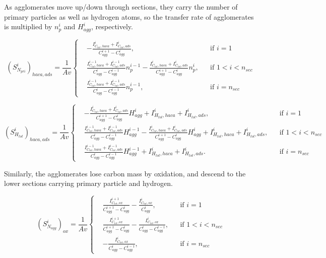 As agglomerates move up/down through sections, they carry the number of primary particles as well as hydrogen atoms, so the transfer rate of agglomerates is multiplied by ${n^i_p}$ and ${H^i_{agg}}$, respectively. 

\begin{equation}
	\left(S^i_{N_{pri}}\right)_{haca, ads}=
	\frac{1}{Av}
	\left\{
	\begin{aligned}
		&-\frac{I^i_{C_{tot},haca}+I^i_{C_{tot},ads}}{C^{i+1}_{agg}-C^{i}_{agg}},
		&&
		\text{if } i = 1
		\\
		&\frac{I^{i-1}_{C_{tot},haca}+I^{i-1}_{C_{tot},ads}}{C^{i}_{agg}-C^{i-1}_{agg}}n^{i-1}_p
		-\frac{I^{i}_{C_{tot},haca}+I^{i}_{C_{tot},ads}}{C^{i+1}_{agg}-C^{i}_{agg}}n^{i}_p,
		&&
		\text{if } 1 < i < n_{sec}
		\\
		&\frac{I^{i-1}_{C_{tot},haca}+I^{i-1}_{C_{tot},ads}}{C^{i}_{agg}-C^{i-1}_{agg}}n^{i-1}_p,
		&&\text{if } i=n_{sec}
	\end{aligned}
	\right.
	\label{eqn:S_Npri_gradssect}
\end{equation}

\begin{equation}
	\left(S^i_{H_{tot}}\right)_{haca, ads}=
	\frac{1}{Av}
	\left\{
	\begin{aligned}
		&-\frac{I^i_{C_{tot},haca}+I^i_{C_{tot},ads}}{C^{i+1}_{agg}-C^{i}_{agg}}H^{i}_{agg} 
		+ I^{i}_{H_{tot}, haca} + I^{i}_{H_{tot}, ads},
		&&
		\text{if } i = 1
		\\
		&\frac{I^{i-1}_{C_{tot},haca}+I^{i-1}_{C_{tot},ads}}{C^{i}_{agg}-C^{i-1}_{agg}}H^{i-1}_{agg}
		-\frac{I^{i}_{C_{tot},haca}+I^{i}_{C_{tot},ads}}{C^{i+1}_{agg}-C^{i}_{agg}}H^{i}_{agg}
		+ I^{i}_{H_{tot}, haca} + I^{i}_{H_{tot}, ads},
		&&
		\text{if } 1 < i < n_{sec}
		\\
		&\frac{I^{i-1}_{C_{tot},haca}+I^{i-1}_{C_{tot},ads}}{C^{i}_{agg}-C^{i-1}_{agg}}H^{i-1}_{agg}
		+ I^{i}_{H_{tot}, haca} + I^{i}_{H_{tot}, ads}.
		&&\text{if } i=n_{sec}
	\end{aligned}
	\right.
	\label{eqn:S_Htot_gradssect}
\end{equation}

Similarly, the agglomerates lose carbon mass by oxidation, and descend to the lower sections carrying primary particle and hydrogen.

\begin{equation}
	\left(S^i_{N_{agg}}\right)_{ox}=
	\frac{1}{Av}
	\left\{
	\begin{aligned}
		&\frac{I^{i+1}_{C_{tot},ox}}{C^{i+1}_{agg}-C^{i}_{agg}}
		-
		\frac{I^{i}_{C_{tot},ox}}{C^{i}_{agg}},
		&&
		\text{if } i = 1
		\\
		&\frac{I^{i+1}_{C_{tot},ox}}{C^{i+1}_{agg}-C^{i}_{agg}}
		-
		\frac{I^{i}_{C_{tot},ox}}{C^{i}_{agg}-C^{i-1}_{agg}},
		&&
		\text{if } 1 < i < n_{sec}
		\\
		&
		-
		\frac{I^{i}_{C_{tot},ox}}{C^{i}_{agg}-C^{i-1}_{agg}},
		&&\text{if } i=n_{sec}
	\end{aligned}
	\right.
	\label{eqn:S_Nagg_oxsect}
\end{equation}

